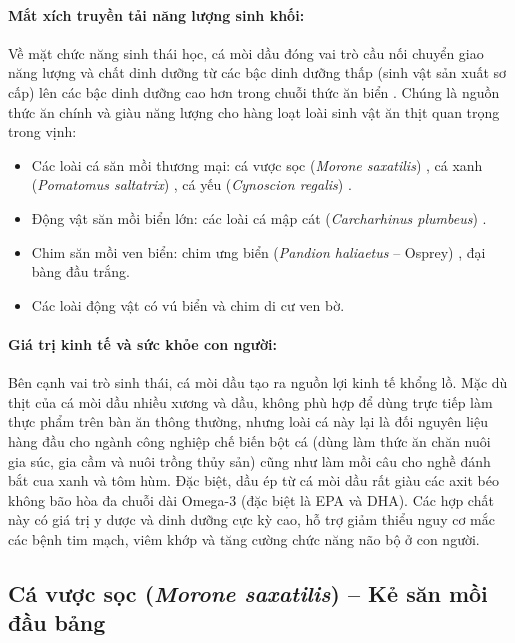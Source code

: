 \paragraph{Mắt xích truyền tải năng lượng sinh khối:}
Về mặt chức năng sinh thái học, cá mòi dầu đóng vai trò cầu nối chuyển giao năng lượng và chất dinh dưỡng từ các bậc dinh dưỡng thấp (sinh vật sản xuất sơ cấp) lên các bậc dinh dưỡng cao hơn trong chuỗi thức ăn biển \cite{anstead2021path}. Chúng là nguồn thức ăn chính và giàu năng lượng cho hàng loạt loài sinh vật ăn thịt quan trọng trong vịnh:
\begin{itemize}
    \item Các loài cá săn mồi thương mại: cá vược sọc (\textit{Morone saxatilis}) \cite{walter2003diet}, cá xanh (\textit{Pomatomus saltatrix}) \cite{harding2001diet}, cá yếu (\textit{Cynoscion regalis}) \cite{merriner1975food}.
    \item Động vật săn mồi biển lớn: các loài cá mập cát (\textit{Carcharhinus plumbeus}) \cite{ellis2003diet}.
    \item Chim săn mồi ven biển: chim ưng biển (\textit{Pandion haliaetus} -- Osprey) \cite{glass2009osprey}, đại bàng đầu trắng.
    \item Các loài động vật có vú biển và chim di cư ven bờ.
\end{itemize}

\paragraph{Giá trị kinh tế và sức khỏe con người:}
Bên cạnh vai trò sinh thái, cá mòi dầu tạo ra nguồn lợi kinh tế khổng lồ. Mặc dù thịt của cá mòi dầu nhiều xương và dầu, không phù hợp để dùng trực tiếp làm thực phẩm trên bàn ăn thông thường, nhưng loài cá này lại là đối nguyên liệu hàng đầu cho ngành công nghiệp chế biến bột cá (dùng làm thức ăn chăn nuôi gia súc, gia cầm và nuôi trồng thủy sản) cũng như làm mồi câu cho nghề đánh bắt cua xanh và tôm hùm. Đặc biệt, dầu ép từ cá mòi dầu rất giàu các axit béo không bão hòa đa chuỗi dài Omega-3 (đặc biệt là EPA và DHA). Các hợp chất này có giá trị y dược và dinh dưỡng cực kỳ cao, hỗ trợ giảm thiểu nguy cơ mắc các bệnh tim mạch, viêm khớp và tăng cường chức năng não bộ ở con người.

\subsection{Cá vược sọc (\textit{Morone saxatilis}) -- Kẻ săn mồi đầu bảng}

